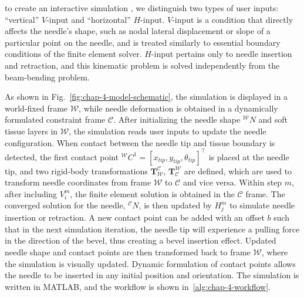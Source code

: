 to create an interactive simulation , we distinguish two types of user inputs: ``vertical'' $V$-input and ``horizontal'' $H$-input. $V$-input is a condition that directly affects the needle's shape, such as nodal lateral displacement or slope of a particular point on the needle, and is treated similarly to essential boundary conditions of the finite element solver. $H$-input pertains only to needle insertion and retraction, and this kinematic problem is solved independently from the beam-bending problem. 

As shown in Fig.~\ref{fig:chap-4-model-schematic}, the simulation is displayed in a world-fixed frame $\mathcal{W}$, while needle deformation is obtained in a dynamically formulated constraint frame $\mathcal{C}$. After initializing the needle shape ${}^{\mathcal{W}}N$ and soft tissue layers in $\mathcal{W}$, the simulation reads user inputs to update the needle configuration. When contact between the needle tip and tissue boundary is detected, the first contact point ${}^\mathcal{W}C^1 = [x_{tip}, y_{tip}, \theta_{tip}]^\top$ is placed at the needle tip, and two rigid-body transformations $\mathbf{T}_\mathcal{W}^\mathcal{C}$, $\mathbf{T}_\mathcal{C}^\mathcal{W}$ are defined, which are used to transform needle coordinates from frame $\mathcal{W}$ to $\mathcal{C}$ and vice versa. Within step $m$, after including $V_i^m$, the finite element solution is obtained in the $\mathcal{C}$ frame. The converged solution for the needle, ${}^\mathcal{C}N$, is then updated by $H_j^m$ to simulate needle insertion or retraction. A new contact point can be added with an offset $b$ such that in the next simulation iteration, the needle tip will experience a pulling force in the direction of the bevel, thus creating a bevel insertion effect. Updated needle shape and contact points are then transformed back to frame $\mathcal{W}$, where the simulation is visually updated. Dynamic formulation of contact points allows the needle to be inserted in any initial position and orientation. The simulation is written in MATLAB, and the workflow is shown in~\cref{alg:chap-4-workflow}.

